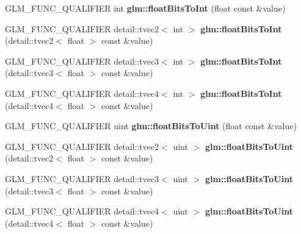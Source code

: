 \begin{DoxyCompactItemize}
\item 
\hypertarget{namespaceglm_a9d47b5d53fd4686a4f6e94bfd13d8b87}{\-G\-L\-M\-\_\-\-F\-U\-N\-C\-\_\-\-Q\-U\-A\-L\-I\-F\-I\-E\-R int {\bfseries glm\-::float\-Bits\-To\-Int} (float const \&value)}\label{namespaceglm_a9d47b5d53fd4686a4f6e94bfd13d8b87}

\item 
\hypertarget{namespaceglm_a1786fff7a5ce08d23d41c3ce0c3bb3da}{\-G\-L\-M\-\_\-\-F\-U\-N\-C\-\_\-\-Q\-U\-A\-L\-I\-F\-I\-E\-R \*
detail\-::tvec2$<$ int $>$ {\bfseries glm\-::float\-Bits\-To\-Int} (detail\-::tvec2$<$ float $>$ const \&value)}\label{namespaceglm_a1786fff7a5ce08d23d41c3ce0c3bb3da}

\item 
\hypertarget{namespaceglm_ad15d33ead0f23cc3f30437a6779e4a34}{\-G\-L\-M\-\_\-\-F\-U\-N\-C\-\_\-\-Q\-U\-A\-L\-I\-F\-I\-E\-R \*
detail\-::tvec3$<$ int $>$ {\bfseries glm\-::float\-Bits\-To\-Int} (detail\-::tvec3$<$ float $>$ const \&value)}\label{namespaceglm_ad15d33ead0f23cc3f30437a6779e4a34}

\item 
\hypertarget{namespaceglm_a4e90abc22816cc552c342224dfe5bc1b}{\-G\-L\-M\-\_\-\-F\-U\-N\-C\-\_\-\-Q\-U\-A\-L\-I\-F\-I\-E\-R \*
detail\-::tvec4$<$ int $>$ {\bfseries glm\-::float\-Bits\-To\-Int} (detail\-::tvec4$<$ float $>$ const \&value)}\label{namespaceglm_a4e90abc22816cc552c342224dfe5bc1b}

\item 
\hypertarget{namespaceglm_af4b02db577db5f494b887e5fab3159c9}{\-G\-L\-M\-\_\-\-F\-U\-N\-C\-\_\-\-Q\-U\-A\-L\-I\-F\-I\-E\-R uint {\bfseries glm\-::float\-Bits\-To\-Uint} (float const \&value)}\label{namespaceglm_af4b02db577db5f494b887e5fab3159c9}

\item 
\hypertarget{namespaceglm_aa26d288b80921dccfba14f1f87c69dc9}{\-G\-L\-M\-\_\-\-F\-U\-N\-C\-\_\-\-Q\-U\-A\-L\-I\-F\-I\-E\-R \*
detail\-::tvec2$<$ uint $>$ {\bfseries glm\-::float\-Bits\-To\-Uint} (detail\-::tvec2$<$ float $>$ const \&value)}\label{namespaceglm_aa26d288b80921dccfba14f1f87c69dc9}

\item 
\hypertarget{namespaceglm_a9e237f6129858d6a60a5fbb311940b7a}{\-G\-L\-M\-\_\-\-F\-U\-N\-C\-\_\-\-Q\-U\-A\-L\-I\-F\-I\-E\-R \*
detail\-::tvec3$<$ uint $>$ {\bfseries glm\-::float\-Bits\-To\-Uint} (detail\-::tvec3$<$ float $>$ const \&value)}\label{namespaceglm_a9e237f6129858d6a60a5fbb311940b7a}

\item 
\hypertarget{namespaceglm_a597a1ed8073a6f211a0b99bc5bcb5e81}{\-G\-L\-M\-\_\-\-F\-U\-N\-C\-\_\-\-Q\-U\-A\-L\-I\-F\-I\-E\-R \*
detail\-::tvec4$<$ uint $>$ {\bfseries glm\-::float\-Bits\-To\-Uint} (detail\-::tvec4$<$ float $>$ const \&value)}\label{namespaceglm_a597a1ed8073a6f211a0b99bc5bcb5e81}


\end{DoxyCompactItemize}
